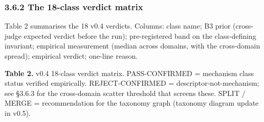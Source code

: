 \documentclass[
  11pt]{article}
\begin{document}
\subsubsection{3.6.2 The 18-class verdict
matrix}\label{362-the-18-class-verdict-matrix}

Table 2 summarises the 18 v0.4 verdicts. Columns: class name; B3 prior
(cross-judge expected verdict before the run); pre-registered band on
the class-defining invariant; empirical measurement (median across
domains, with the cross-domain spread); empirical verdict; one-line
reason.

\textbf{Table 2.} v0.4 18-class verdict matrix. PASS-CONFIRMED =
mechanism class status verified empirically. REJECT-CONFIRMED =
descriptor-not-mechanism; see §3.6.3 for the cross-domain scatter
threshold that screens these. SPLIT / MERGE = recommendation for the
taxonomy graph (taxonomy diagram update in v0.5).
\end{document}
